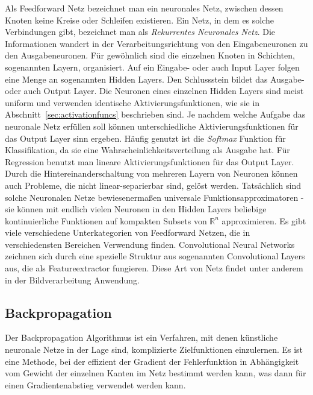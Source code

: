 Als Feedforward Netz bezeichnet man ein neuronales Netz, zwischen dessen Knoten keine Kreise oder Schleifen existieren.
Ein Netz, in dem es solche Verbindungen gibt, bezeichnet man als \textit{Rekurrentes Neuronales Netz}.
Die Informationen wandert in der Verarbeitungsrichtung von den Eingabeneuronen zu den Ausgabeneuronen.
Für gewöhnlich sind die einzelnen Knoten in Schichten, sogenannten Layern, organisiert.
Auf ein Eingabe- oder auch Input Layer folgen eine Menge an sogenannten Hidden Layers.
Den Schlussstein bildet das Ausgabe- oder auch Output Layer.
Die Neuronen eines einzelnen Hidden Layers sind meist uniform und verwenden identische Aktivierungsfunktionen, wie sie in Abschnitt~\ref{sec:activationfuncs} beschrieben sind.
Je nachdem welche Aufgabe das neuronale Netz erfüllen soll können unterschiedliche Aktivierungsfunktionen für das Output Layer sinn ergeben.
Häufig genutzt ist die \textit{Softmax} Funktion für Klassifikation, da sie eine Wahrscheinlichkeitsverteilung als Ausgabe hat.
Für Regression benutzt man lineare Aktivierungsfunktionen für das Output Layer. 
Durch die Hintereinanderschaltung von mehreren Layern von Neuronen können auch Probleme, die nicht linear-separierbar sind, gelöst werden.
Tatsächlich sind solche Neuronalen Netze bewiesenermaßen universale Funktionsapproximatoren - 
sie können mit endlich vielen Neuronen in den Hidden Layers beliebige kontinuierliche Funktionen auf kompakten Subsets von \(\mathbb{R}^n\) approximieren.
Es gibt viele verschiedene Unterkategorien von Feedforward Netzen, die in verschiedensten Bereichen Verwendung finden.
Convolutional Neural Networks zeichnen sich durch eine spezielle Struktur aus sogenannten Convolutional Layers aus, die als Featureextractor fungieren.
Diese Art von Netz findet unter anderem in der Bildverarbeitung Anwendung.

\subsection{Backpropagation}

Der Backpropagation Algorithmus ist ein Verfahren, mit denen künstliche neuronale Netze in der Lage sind, komplizierte Zielfunktionen einzulernen.
Es ist eine Methode, bei der effizient der Gradient der Fehlerfunktion in Abhängigkeit vom Gewicht der einzelnen Kanten im Netz bestimmt werden kann,
was dann für einen Gradientenabstieg verwendet werden kann. 

